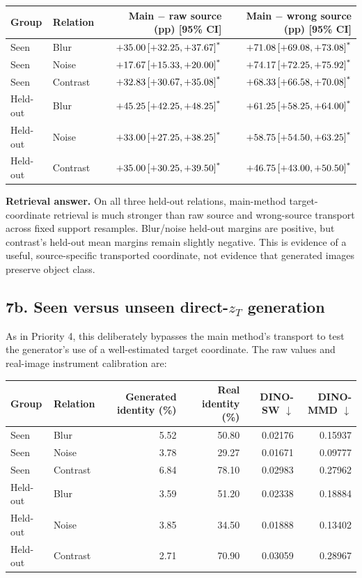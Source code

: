 \documentclass[10pt]{article}
\newcommand{\sig}{\textsuperscript{*}}
\begin{document}
\begin{center}\scriptsize
\begin{tabular}{llrr}
\toprule
Group & Relation & Main $-$ raw source (pp) [95\% CI] & Main $-$ wrong source (pp) [95\% CI]\\
\midrule
Seen & Blur & $+35.00\,[+32.25,+37.67]\sig$ & $+71.08\,[+69.08,+73.08]\sig$\\
Seen & Noise & $+17.67\,[+15.33,+20.00]\sig$ & $+74.17\,[+72.25,+75.92]\sig$\\
Seen & Contrast & $+32.83\,[+30.67,+35.08]\sig$ & $+68.33\,[+66.58,+70.08]\sig$\\
Held-out & Blur & $+45.25\,[+42.25,+48.25]\sig$ & $+61.25\,[+58.25,+64.00]\sig$\\
Held-out & Noise & $+33.00\,[+27.25,+38.25]\sig$ & $+58.75\,[+54.50,+63.25]\sig$\\
Held-out & Contrast & $+35.00\,[+30.25,+39.50]\sig$ & $+46.75\,[+43.00,+50.50]\sig$\\
\bottomrule
\end{tabular}
\end{center}

\textbf{Retrieval answer.} On all three held-out relations, main-method target-coordinate retrieval is much stronger than raw source and wrong-source transport across fixed support resamples. Blur/noise held-out margins are positive, but contrast's held-out mean margins remain slightly negative. This is evidence of a useful, source-specific transported coordinate, not evidence that generated images preserve object class.

\subsection*{7b. Seen versus unseen direct-$z_T$ generation}

As in Priority 4, this deliberately bypasses the main method's transport to test the generator's use of a well-estimated target coordinate. The raw values and real-image instrument calibration are:

\begin{center}\small
\begin{tabular}{llrrrr}
\toprule
Group & Relation & Generated identity (\%) & Real identity (\%) & DINO-SW $\downarrow$ & DINO-MMD $\downarrow$\\
\midrule
Seen & Blur & 5.52 & 50.80 & 0.02176 & 0.15937\\
Seen & Noise & 3.78 & 29.27 & 0.01671 & 0.09777\\
Seen & Contrast & 6.84 & 78.10 & 0.02983 & 0.27962\\
Held-out & Blur & 3.59 & 51.20 & 0.02338 & 0.18884\\
Held-out & Noise & 3.85 & 34.50 & 0.01888 & 0.13402\\
Held-out & Contrast & 2.71 & 70.90 & 0.03059 & 0.28967\\
\bottomrule
\end{tabular}
\end{center}
\end{document}
